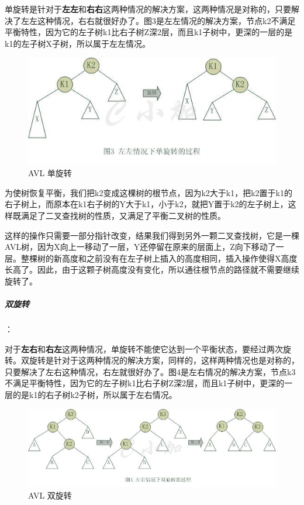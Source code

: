 \documentclass[UTF8,a4paper,12pt]{ctexbook}
\begin{document}
				单旋转是针对于\textbf{左左}和\textbf{右右}这两种情况的解决方案，这两种情况是对称的，只要解决了左左这种情况，右右就很好办了。图3是左左情况的解决方案，节点k2不满足平衡特性，因为它的左子树k1比右子树Z深2层，而且k1子树中，更深的一层的是k1的左子树X子树，所以属于左左情况。
					\begin{figure}[h]
						\centering
						\includegraphics[scale = 0.8]{Rotate_1.jpg}
						\caption{AVL 单旋转}
					\end{figure}
					
				为使树恢复平衡，我们把k2变成这棵树的根节点，因为k2大于k1，把k2置于k1的右子树上，而原本在k1右子树的Y大于k1，小于k2，就把Y置于k2的左子树上，这样既满足了二叉查找树的性质，又满足了平衡二叉树的性质。
				
				这样的操作只需要一部分指针改变，结果我们得到另外一颗二叉查找树，它是一棵AVL树，因为X向上一移动了一层，Y还停留在原来的层面上，Z向下移动了一层。整棵树的新高度和之前没有在左子树上插入的高度相同，插入操作使得X高度长高了。因此，由于这颗子树高度没有变化，所以通往根节点的路径就不需要继续旋转了。
					
			\subparagraph{双旋转}：
			
				对于\textbf{左右}和\textbf{右左}这两种情况，单旋转不能使它达到一个平衡状态，要经过两次旋转。双旋转是针对于这两种情况的解决方案，同样的，这样两种情况也是对称的，只要解决了左右这种情况，右左就很好办了。图4是左右情况的解决方案，节点k3不满足平衡特性，因为它的左子树k1比右子树Z深2层，而且k1子树中，更深的一层的是k1的右子树k2子树，所以属于左右情况。
				\begin{figure}[h]
					\centering
					\includegraphics[scale = 0.8]{Rotate_2.jpg}
					\caption{AVL 双旋转}
				\end{figure}
				
\end{document}
